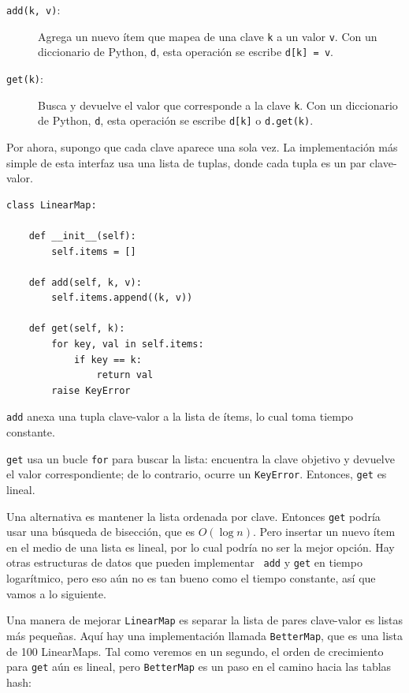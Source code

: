 \documentclass[10pt]{book}
\begin{document}
\begin{description}

\item[{\tt add(k, v)}:] Agrega un nuevo ítem que mapea de una clave {\tt k}
a un valor {\tt v}.  Con un diccionario de Python, {\tt d}, esta operación
se escribe {\tt d[k] = v}.

\item[{\tt get(k)}:] Busca y devuelve el valor que corresponde
a la clave {\tt k}.  Con un diccionario de Python, {\tt d}, esta operación
se escribe {\tt d[k]} o {\tt d.get(k)}.

\end{description}

Por ahora, supongo que cada clave aparece una sola vez.
La implementación más simple de esta interfaz usa una lista de
tuplas, donde cada tupla es un par clave-valor.

\begin{verbatim}
class LinearMap:

    def __init__(self):
        self.items = []

    def add(self, k, v):
        self.items.append((k, v))

    def get(self, k):
        for key, val in self.items:
            if key == k:
                return val
        raise KeyError
\end{verbatim}

{\tt add} anexa una tupla clave-valor a la lista de ítems, lo cual
toma tiempo constante.

{\tt get} usa un bucle {\tt for} para buscar la lista:
encuentra la clave objetivo y devuelve el valor correspondiente;
de lo contrario, ocurre un {\tt KeyError}.
Entonces, {\tt get} es lineal.

Una alternativa es mantener la lista ordenada por clave.  Entonces {\tt get}
podría usar una búsqueda de bisección, que es $O(\log n)$.  Pero insertar un
nuevo ítem en el medio de una lista es lineal, por lo cual podría no ser la
mejor opción.  Hay otras estructuras de datos que pueden implementar {\tt
  add} y {\tt get} en tiempo logarítmico, pero eso aún no es tan bueno como
el tiempo constante, así que vamos a lo siguiente.

Una manera de mejorar {\tt LinearMap} es separar la lista de pares clave-valor
es listas más pequeñas.  Aquí hay una implementación llamada
{\tt BetterMap}, que es una lista de 100 LinearMaps.  Tal como veremos
en un segundo, el orden de crecimiento para {\tt get} aún es lineal,
pero {\tt BetterMap} es un paso en el camino hacia las tablas hash:
\end{document}
